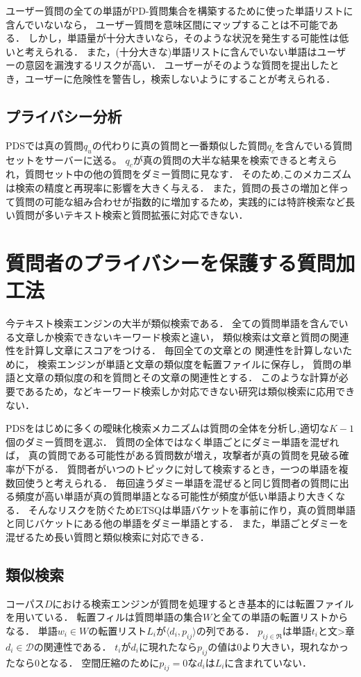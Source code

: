 \documentclass[master]{suribt}
\theoremstyle{definition}
\begin{document}
 ユーザー質問の全ての単語がPD-質問集合を構築するために使った単語リストに含んでいないなら，
 ユーザー質問を意味区間にマップすることは不可能である．
 しかし，単語量が十分大きいなら，そのような状況を発生する可能性は低いと考えられる．
 また，(十分大きな)単語リストに含んでいない単語はユーザーの意図を漏洩するリスクが高い．
 ユーザーがそのような質問を提出したとき，ユーザーに危険性を警告し，検索しないようにすることが考えられる．

 \subsection{プライバシー分析}
 PDSでは真の質問$q_u$の代わりに真の質問と一番類似した質問$q_c$を含んでいる質問セットをサーバーに送る。
 $q_c$が真の質問の大半な結果を検索できると考えられ，質問セット中の他の質問をダミー質問に見なす．
 そのため,このメカニズムは検索の精度と再現率に影響を大きく与える．
 また，質問の長さの増加と伴って質問の可能な組み合わせが指数的に増加するため，実践的には特許検索など長い質問が多いテキスト検索と質問拡張に対応できない．

 \section{質問者のプライバシーを保護する質問加工法} \label{s:ETSQ}
 今テキスト検索エンジンの大半が類似検索である．
 全ての質問単語を含んでいる文章しか検索できないキーワード検索と違い，
 類似検索は文章と質問の関連性を計算し文章にスコアをつける\cite{}．
 毎回全ての文章との 関連性を計算しないために，
 検索エンジンが単語と文章の類似度を転置ファイルに保存し，
 質問の単語と文章の類似度の和を質問とその文章の関連性とする．
 このような計算が必要であるため，\cite{}などキーワード検索しか対応できない研究は類似検索に応用できない．

 PDSをはじめに多くの曖昧化検索メカニズム\cite{}は質問の全体を分析し,適切な$K−1$個のダミー質問を選ぶ．
 質問の全体ではなく単語ごとにダミー単語を混ぜれば，
 真の質問である可能性がある質問数が増え，攻撃者が真の質問を見破る確率が下がる．
 質問者がいつのトピックに対して検索するとき，一つの単語を複数回使うと考えられる．
 毎回違うダミー単語を混ぜると同じ質問者の質問に出る頻度が高い単語が真の質問単語となる可能性が頻度が低い単語より大きくなる．
 そんなリスクを防ぐためETSQは単語バケットを事前に作り，真の質問単語と同じバケットにある他の単語をダミー単語とする．
 また，単語ごとダミーを混ぜるため長い質問と類似検索に対応できる．

 \subsection{類似検索}
 コーパス$D$における検索エンジンが質問を処理するとき基本的には転置ファイルを用いている．
 転置フィルは質問単語の集合$W$と全ての単語の転置リストからなる．
 単語$w_i \in W$の転置リスト$L_i$が$\langle d_i,p_{ij}\rangle$の列である．
 $p_{ij \in \Re}$は単語$t_i$と文>章$d_i \in \mathcal{D}$の関連性である．
 $t_i$が$d_i$に現れたなら$p_{ij}$の値は$0$より大きい，現れなかったなら$0$となる．
 空間圧縮のために$p_{ij}=0$な$d_i$は$L_i$に含まれていない．
\end{document}
